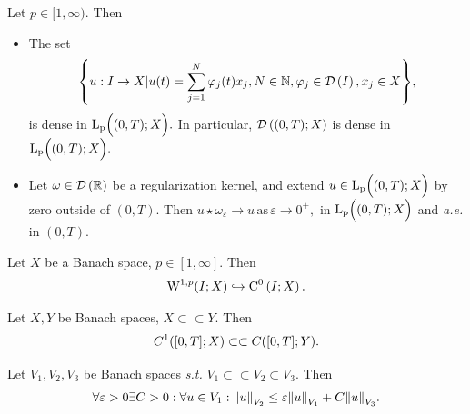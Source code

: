 \documentclass{article}
\begin{document}
\begin{lemma}
    Let $p \in [1, \infty).$ Then
    \begin{itemize}
	    \item The set
		    \[
			    \qty{u: I \to X | u(t) = \sum_{j=1}^N \varphi_j(t) x_j, N \in \ensuremath{{\mathbb N}}, \varphi_j \in  \ensuremath{\mathcal{D}\!\,\left(I \right)}, x_j \in X},
		    \]
		    is dense in $\text{L}_{\text{p}}\!\,\Bigl( (0,T);X \Bigr).$ In particular, $\mathcal{D}\!\,\left(\qty(0,T);X \right)$ is dense in $\text{L}_{\text{p}}\!\,\Bigl( (0,T);X \Bigr).$
	    \item Let $\omega \in \mathcal{D}\!\,\left({\mathbb R} \right)$ be a regularization kernel, and extend $u \in \text{L}_{\text{p}}\!\,\Bigl( (0,T);X \Bigr)$ by zero outside of $(0,T)$. Then $u\star \omega_{\varepsilon} \to u \, \text{as} \,\varepsilon \to 0^+,$ in $\text{L}_{\text{p}}\!\,\Bigl( (0,T);X \Bigr)$ and \textit{a.e.} in $(0,T).$
    \end{itemize}
\end{lemma}

\begin{theorem}
	Let $X$ be a Banach space, $ p \in [1, \infty].$ Then
	\[
		\WkpSet[1][p]{I; X} \hookrightarrow \CkSet{0}{I; X}.
	\]
\end{theorem}
\begin{lemma}
	Let $X,Y$ be Banach spaces, $X \subset \subset Y.$ Then
	\[
		C^1\qty([0,T];X) \subset \subset C\qty([0,T];Y).
	\]
\end{lemma}

\begin{lemma}[Ehrling]
	Let $V_1, V_2, V_3$ be Banach spaces \textit{s.t.} $V_1 \subset \subset V_2 \subset V_3.$ Then
	\[
		\forall \varepsilon >0 \exists C>0: \forall u \in V_1: \norm{u}_{V_2} \leq \varepsilon \norm{u}_{V_1}+C \norm{u}_{V_3}.
	\]
\end{lemma}
\end{document}
